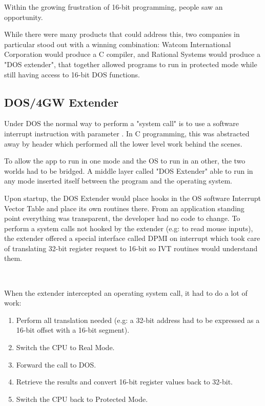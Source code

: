 \par
Within the growing frustration of 16-bit programming, people saw an opportunity.\newpage 

While there were many products that could address this, two companies in particular stood out with a winning combination: Watcom International Corporation would produce a C compiler, and Rational Systems would produce a "DOS extender", that together allowed programs to run in protected mode while still having access to 16-bit DOS functions.\\
\par


\subsection{DOS/4GW Extender}
Under DOS the normal way to perform a "system call" is to use a software interrupt instruction with parameter . In C programming, this was abstracted away by header  which performed all the lower level work behind the scenes.\\
\par
{}
To allow the app to run in one mode and the OS to run in an other, the two worlds had to be bridged. A middle layer called "DOS Extender" able to run in any mode inserted itself between the program and the operating system.\\

\par
{}
Upon startup, the DOS Extender would place hooks in the OS software Interrupt Vector Table and place its own routines there. From an application standing point everything was transparent, the developer had no code to change. To perform a system calls not hooked by the extender (e.g:  to read mouse inputs), the extender offered a special interface called DPMI on interrupt  which took care of translating 32-bit register request to 16-bit so IVT routines would understand them.\\
\par
{}\\
\par
When the extender intercepted an operating system call, it had to do a lot of work:
\begin{enumerate}
\item Perform all translation needed (e.g: a 32-bit address had to be expressed as a 16-bit offset with a 16-bit segment).
\item Switch the CPU to Real Mode.
\item Forward the call to DOS.
\item Retrieve the results and convert 16-bit register values back to 32-bit.
\item Switch the CPU back to Protected Mode.
\end{enumerate} 

